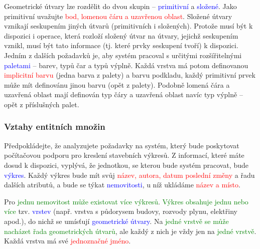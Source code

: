 \documentclass{beamer}
\begin{document}
{\begin{frame}
{    \hspace{0.5cm}Geometrické útvary lze rozdělit do dvou skupin -- \textcolor{blue}{primitivní} a \textcolor{blue}{složené}. Jako primitivní
    uvažujte \textcolor{red}{bod, lomenou čáru a uzavřenou oblast}. Složené útvary vznikají seskupením jiných
    útvarů (primitivních i složených). Protože musí být k dispozici i operace, která rozloží
    složený útvar na útvary, jejichž seskupením vznikl, musí být tato informace (tj. které
    prvky seskupení tvoří) k dispozici. Jedním z dalších požadavků je, aby systém pracoval
    s určitými rozšířitelnými \textcolor{blue}{paletami} -- barev, typů čar a typů výplně. Každá vrstva má
    potom definovanou \textcolor{red}{implicitní barvu} (jedna barva  z  palety) a barvu podkladu, každý
    primitivní prvek může mít definovánu jinou barvu (opět z palety). Podobně lomená čára
    a uzavřená oblast mají definován typ čáry a uzavřená oblast navíc typ výplně – opět
    z příslušných palet.\par}
  \end{frame}
  \begin{frame}
      \frametitle{Vztahy entitních množin}
      \scriptsize{
      \hspace{0.5cm}Předpokládejte, že analyzujete požadavky na systém, který bude poskytovat počítačovou
      podporu pro kreslení stavebních výkresů. Z informací, které máte dosud k dispozici,
      vyplývá, že jednotkou, se kterou bude systém pracovat, bude \textcolor{blue}{výkres}. Každý výkres bude
      mít svůj \textcolor{red}{název, autora, datum poslední změny} a řadu dalších atributů, a bude se týkat
      \textcolor{blue}{nemovitosti}, u níž ukládáme \textcolor{red}{název a místo}.\par


      \hspace{0.5cm}Pro \textcolor{green}{jednu nemovitost může existovat více výkresů}. \textcolor{green}{Výkres obsahuje jednu nebo více} tzv.
      \textcolor{blue}{vrstev} (např. vrstva s půdorysem budovy, rozvody plynu, elektřiny apod.), do nichž se
      umísťují \textcolor{blue}{geometrické útvary}. Na \textcolor{green}{jedné vrstvě se může nacházet řada geometrických útvarů},
      ale každý z nich je vždy jen na \textcolor{green}{jedné vrstvě}. Každá vrstva má své \textcolor{red}{jednoznačné jméno}.\par


}
\end{frame}}
\end{document}
